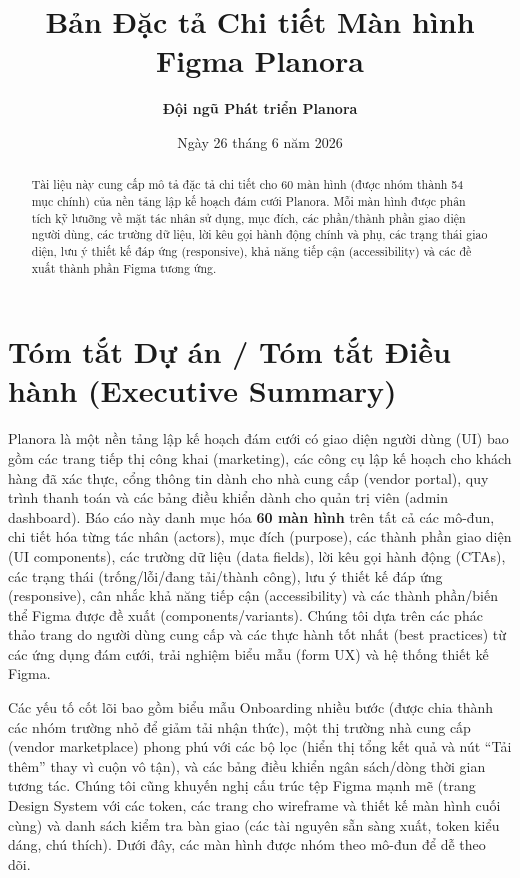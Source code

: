 \documentclass[11pt,a4paper]{article}
\title{\textbf{Bản Đặc tả Chi tiết Màn hình Figma Planora}}
\author{\textbf{Đội ngũ Phát triển Planora}}
\date{Ngày 26 tháng 6 năm 2026}
\begin{document}
\maketitle

\begin{abstract}
Tài liệu này cung cấp mô tả đặc tả chi tiết cho 60 màn hình (được nhóm thành 54 mục chính) của nền tảng lập kế hoạch đám cưới Planora. Mỗi màn hình được phân tích kỹ lưuỡng về mặt tác nhân sử dụng, mục đích, các phần/thành phần giao diện người dùng, các trường dữ liệu, lời kêu gọi hành động chính và phụ, các trạng thái giao diện, lưu ý thiết kế đáp ứng (responsive), khả năng tiếp cận (accessibility) và các đề xuất thành phần Figma tương ứng.
\end{abstract}

\tableofcontents
\newpage

\section{Tóm tắt Dự án / Tóm tắt Điều hành (Executive Summary)}
Planora là một nền tảng lập kế hoạch đám cưới có giao diện người dùng (UI) bao gồm các trang tiếp thị công khai (marketing), các công cụ lập kế hoạch cho khách hàng đã xác thực, cổng thông tin dành cho nhà cung cấp (vendor portal), quy trình thanh toán và các bảng điều khiển dành cho quản trị viên (admin dashboard). Báo cáo này danh mục hóa \textbf{60 màn hình} trên tất cả các mô-đun, chi tiết hóa từng tác nhân (actors), mục đích (purpose), các thành phần giao diện (UI components), các trường dữ liệu (data fields), lời kêu gọi hành động (CTAs), các trạng thái (trống/lỗi/đang tải/thành công), lưu ý thiết kế đáp ứng (responsive), cân nhắc khả năng tiếp cận (accessibility) và các thành phần/biến thể Figma được đề xuất (components/variants). Chúng tôi dựa trên các phác thảo trang do người dùng cung cấp và các thực hành tốt nhất (best practices) từ các ứng dụng đám cưới, trải nghiệm biểu mẫu (form UX) và hệ thống thiết kế Figma.

Các yếu tố cốt lõi bao gồm biểu mẫu Onboarding nhiều bước (được chia thành các nhóm trường nhỏ để giảm tải nhận thức), một thị trường nhà cung cấp (vendor marketplace) phong phú với các bộ lọc (hiển thị tổng kết quả và nút ``Tải thêm'' thay vì cuộn vô tận), và các bảng điều khiển ngân sách/dòng thời gian tương tác. Chúng tôi cũng khuyến nghị cấu trúc tệp Figma mạnh mẽ (trang Design System với các token, các trang cho wireframe và thiết kế màn hình cuối cùng) và danh sách kiểm tra bàn giao (các tài nguyên sẵn sàng xuất, token kiểu dáng, chú thích). Dưới đây, các màn hình được nhóm theo mô-đun để dễ theo dõi.
\end{document}

